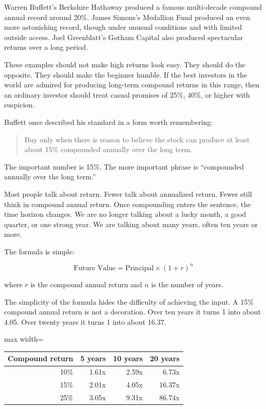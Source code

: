 Warren Buffett's Berkshire Hathaway produced a famous multi-decade compound annual record around 20\%. James Simons's Medallion Fund produced an even more astonishing record, though under unusual conditions and with limited outside access. Joel Greenblatt's Gotham Capital also produced spectacular returns over a long period.

These examples should not make high returns look easy. They should do the opposite. They should make the beginner humble. If the best investors in the world are admired for producing long-term compound returns in this range, then an ordinary investor should treat casual promises of 25\%, 40\%, or higher with suspicion.

Buffett once described his standard in a form worth remembering:

\begin{quote}
Buy only when there is reason to believe the stock can produce at least about 15\% compounded annually over the long term.
\end{quote}

The important number is 15\%. The more important phrase is ``compounded annually over the long term.''

Most people talk about return. Fewer talk about annualized return. Fewer still think in compound annual return. Once compounding enters the sentence, the time horizon changes. We are no longer talking about a lucky month, a good quarter, or one strong year. We are talking about many years, often ten years or more.

The formula is simple:

\[
\text{Future Value}
=
\text{Principal}
\times
(1+r)^n
\]

where \(r\) is the compound annual return and \(n\) is the number of years.

The simplicity of the formula hides the difficulty of achieving the input. A 15\% compound annual return is not a decoration. Over ten years it turns 1 into about 4.05. Over twenty years it turns 1 into about 16.37.

\begin{center}
\begin{adjustbox}{max width=\linewidth}
\begin{tabular}{rrrr}
\hline
Compound return & 5 years & 10 years & 20 years \\
\hline
10\% & 1.61x & 2.59x & 6.73x \\
15\% & 2.01x & 4.05x & 16.37x \\
25\% & 3.05x & 9.31x & 86.74x \\
\hline
\end{tabular}
\end{adjustbox}
\end{center}


